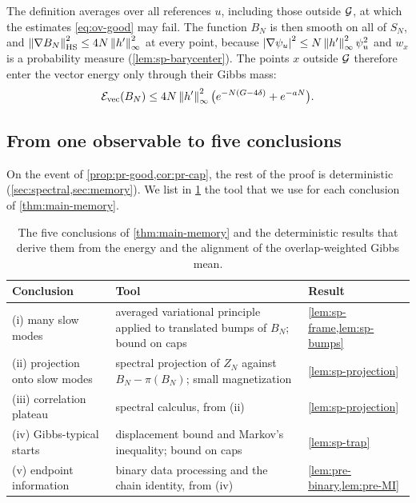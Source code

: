 The definition averages over all references $u$, including those outside $\mathcal G$, at which the estimates \eqref{eq:ov-good} may fail. The function $B_N$ is then smooth on all of $S_N$, and $\left\lVert\nabla B_N\right\rVert_{\rm HS}^2\le4N\left\lVert h'\right\rVert_\infty^2$ at every point, because $\left|\nabla\psi_u\right|^2\le N\left\lVert h'\right\rVert_\infty^2\psi_u^2$ and $w_x$ is a probability measure (\cref{lem:sp-barycenter}). The points $x$ outside $\mathcal G$ therefore enter the vector energy only through their Gibbs mass:
\begin{equation}\label{eq:ov-energy}
\mathcal E_{\rm vec}(B_N)\le4N\left\lVert h'\right\rVert_\infty^2\bigl(e^{-N(G-4\delta)}+e^{-aN}\bigr).
\end{equation}

\subsection{From one observable to five conclusions}\label{sec:ov-five}

On the event of \cref{prop:pr-good,cor:pr-cap}, the rest of the proof is deterministic (\cref{sec:spectral,sec:memory}). We list in \cref{tab:ov-five} the tool that we use for each conclusion of \cref{thm:main-memory}.

\begin{table}[ht]
\centering
\small
\begin{tabular}{@{}>{\raggedright\arraybackslash}p{}>{\raggedright\arraybackslash}p{}>{\raggedright\arraybackslash}p{}@{}}
\toprule
Conclusion & Tool & Result\\
\midrule
(i) many slow modes & averaged variational principle applied to translated bumps of $B_N$; bound on caps & \cref{lem:sp-frame,lem:sp-bumps}\\
(ii) projection onto slow modes & spectral projection of $Z_N$ against $B_N-\pi(B_N)$; small magnetization & \cref{lem:sp-projection}\\
(iii) correlation plateau & spectral calculus, from (ii) & \cref{lem:sp-projection}\\
(iv) Gibbs-typical starts & displacement bound and Markov's inequality; bound on caps & \cref{lem:sp-trap}\\
(v) endpoint information & binary data processing and the chain identity, from (iv) & \cref{lem:pre-binary,lem:pre-MI}\\
\bottomrule
\end{tabular}
\caption{The five conclusions of \cref{thm:main-memory} and the deterministic results that derive them from the energy and the alignment of the overlap-weighted Gibbs mean.}
\label{tab:ov-five}
\end{table}

